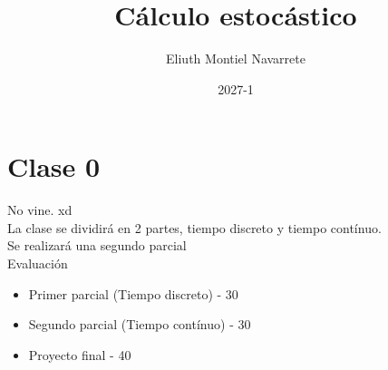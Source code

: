 \documentclass{article}
\title{Cálculo estocástico}
\author{Eliuth Montiel Navarrete}
\date{2027-1}
\begin{document}
    \maketitle
    \tableofcontents
    \newpage
    \section{Clase 0}
        No vine. xd
        \\
        La clase se dividirá en 2 partes, tiempo discreto y tiempo contínuo.
        \\
        Se realizará una segundo parcial
        \\
        Evaluación
        \begin{itemize}
            \item Primer parcial (Tiempo discreto) - 30%
            \item Segundo parcial (Tiempo contínuo) - 30%
            \item Proyecto final - 40%
        \end{itemize}
\end{document}

